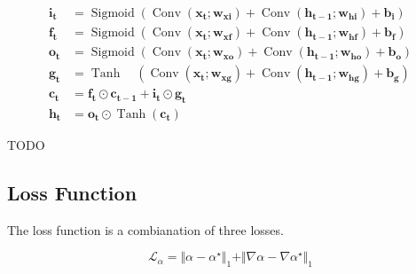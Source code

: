 \documentclass[final]{cvpr}
\begin{document}
\begin{equation}
    \begin{aligned}
        \mathbf{i}_{\mathbf{t}} & = \operatorname{Sigmoid}\left(\operatorname{Conv}\left(\mathbf{x}_{\mathbf{t}} ; \mathbf{w}_{\mathbf{x i}}\right)+\operatorname{Conv}\left(\mathbf{h}_{\mathbf{t}-\mathbf{1}} ; \mathbf{w}_{\mathbf{h i}}\right)+\mathbf{b}_{\mathbf{i}}\right)    \\
        \mathbf{f}_{\mathbf{t}} & = \operatorname{Sigmoid}\left(\operatorname{Conv}\left(\mathbf{x}_{\mathbf{t}} ; \mathbf{w}_{\mathbf{x f}}\right)+\operatorname{Conv}\left(\mathbf{h}_{\mathbf{t}-\mathbf{1}} ; \mathbf{w}_{\mathbf{h f}}\right)+\mathbf{b}_{\mathbf{f}}\right)    \\
        \mathbf{o}_{\mathbf{t}} & = \operatorname{Sigmoid}\left(\operatorname{Conv}\left(\mathbf{x}_{\mathbf{t}} ; \mathbf{w}_{\mathbf{x o}}\right)+\operatorname{Conv}\left(\mathbf{h}_{\mathbf{t}-\mathbf{1}} ; \mathbf{w}_{\mathbf{h o}}\right)+\mathbf{b}_{\mathbf{o}}\right)    \\
        \mathbf{g}_{\mathbf{t}} & = \operatorname{Tanh} \quad\left(\operatorname{Conv}\left(\mathbf{x}_{\mathbf{t}} ; \mathbf{w}_{\mathbf{x g}}\right)+\operatorname{Conv}\left(\mathbf{h}_{\mathbf{t}-\mathbf{1}} ; \mathbf{w}_{\mathbf{h g}}\right)+\mathbf{b}_{\mathbf{g}}\right) \\
        \mathbf{c}_{\mathbf{t}} & = \mathbf{f}_{\mathbf{t}} \odot \mathbf{c}_{\mathbf{t}-\mathbf{1}}+\mathbf{i}_{\mathbf{t}} \odot \mathbf{g}_{\mathbf{t}}                                                                                                                           \\
        \mathbf{h}_{\mathbf{t}} & = \mathbf{o}_{\mathbf{t}} \odot \operatorname{Tanh}\left(\mathbf{c}_{\mathbf{t}}\right)
    \end{aligned}
\end{equation}\label{convLSTM}

TODO

\subsection{Loss Function}

The loss function is a combianation of three losses.

\begin{equation}
    \mathcal{L}_\alpha=\Vert\alpha-\alpha^\star\Vert_1+\Vert\nabla\alpha-\nabla\alpha^\star\Vert_1
\end{equation}\label{lossAlpha}
\end{document}
